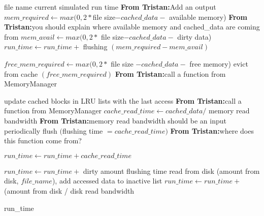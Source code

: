 \documentclass[conference]{IEEEtran}
\newcommand{\Desc}[2]{\State \makebox[5em][l]{#1}#2}
\newcommand{\tristan}[1]{\color{orange}\textbf{From Tristan:}#1\color{black}}
\begin{document}
			\begin{algorithm}\caption{Read \tristan{Avoid using math mode for variable names}}\label{alg:read}
				\small
				\begin{algorithmic}[1]
					\Input
        				\Desc{$file\_name$}{file name}
						\Desc{$run\_time$}{current simulated run time}
					\tristan{Add an output}
   					\EndInput
					\State $mem\_required \gets max(0, 2* $file size$-cached\_data -$ available memory) \tristan{you should explain where available memory and cached\_data are coming from}
					\State $mem\_avail \gets max(0, 2 *$ file size$ - cached\_data -$ dirty data)
    					\State $run\_time \gets run\_time + $  flushing $(mem\_required - mem\_avail)	$
					\EndIf
										
					\State $free\_mem\_required \gets max(0, 2 *$ file size $- cached\_data -$ free memory)
						\State evict from cache $(free\_mem\_required)$ \tristan{call a function from MemoryManager}
					\EndIf
						
    					\State update cached blocks in LRU lists with the last access \tristan{call a function from MemoryManager}
    						\State $cache\_read\_time \gets cached\_data /$ memory read bandwidth \tristan{memory read bandwidth should be an input}
    						\State periodically flush $($flushing time $= cache\_read\_time)$ \tristan{where does this function come from?}
    						
							\Return $run\_time \gets run\_time + cache\_read\_time$
						\EndIf
					\EndIf

							\State $run\_time \gets run\_time +$ dirty amount flushing time
						\EndIf
						\State read from disk (amount from disk, $file\_name$), add accessed data to inactive list
    					\State $run\_time \gets run\_time +$ (amount from disk / disk read bandwidth
					\EndIf
					
					\Return run{\_}time
					
				\end{algorithmic}
			\end{algorithm}			
			
\end{document}
